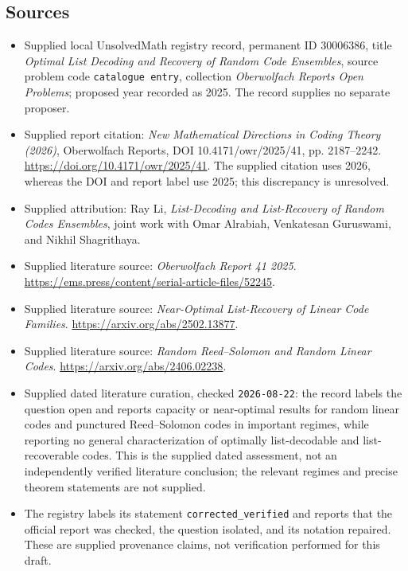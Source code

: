 \documentclass[11pt]{article}
\begin{document}
\subsection{Sources}
\begin{itemize}
\item Supplied local UnsolvedMath registry record, permanent ID \(30006386\), title \emph{Optimal List Decoding and Recovery of Random Code Ensembles}, source problem code \texttt{catalogue entry}, collection \emph{Oberwolfach Reports Open Problems}; proposed year recorded as 2025. The record supplies no separate proposer.
\item Supplied report citation: \emph{New Mathematical Directions in Coding Theory (2026)}, Oberwolfach Reports, DOI 10.4171/owr/2025/41, pp. 2187--2242. \url{https://doi.org/10.4171/owr/2025/41}. The supplied citation uses 2026, whereas the DOI and report label use 2025; this discrepancy is unresolved.
\item Supplied attribution: Ray Li, \emph{List-Decoding and List-Recovery of Random Codes Ensembles}, joint work with Omar Alrabiah, Venkatesan Guruswami, and Nikhil Shagrithaya.
\item Supplied literature source: \emph{Oberwolfach Report 41 2025}. \url{https://ems.press/content/serial-article-files/52245}.
\item Supplied literature source: \emph{Near-Optimal List-Recovery of Linear Code Families}. \url{https://arxiv.org/abs/2502.13877}.
\item Supplied literature source: \emph{Random Reed--Solomon and Random Linear Codes}. \url{https://arxiv.org/abs/2406.02238}.
\item Supplied dated literature curation, checked \texttt{2026-08-22}: the record labels the question open and reports capacity or near-optimal results for random linear codes and punctured Reed--Solomon codes in important regimes, while reporting no general characterization of optimally list-decodable and list-recoverable codes. This is the supplied dated assessment, not an independently verified literature conclusion; the relevant regimes and precise theorem statements are not supplied.
\item The registry labels its statement \texttt{corrected\_verified} and reports that the official report was checked, the question isolated, and its notation repaired. These are supplied provenance claims, not verification performed for this draft.
\end{itemize}
\end{document}
